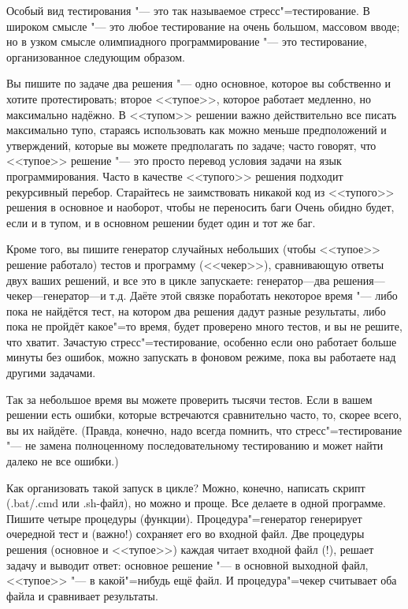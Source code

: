 Особый вид тестирования "--- это так называемое стресс"=тестирование. В широком смысле "--- это любое тестирование на очень большом, массовом вводе; 
но в узком смысле олимпиадного программирование "--- это тестирование, организованное следующим образом.

Вы пишите по задаче два решения "--- одно основное, которое вы собственно и хотите протестировать; второе <<тупое>>, которое работает медленно, но максимально надёжно. 
В <<тупом>> решении важно действительно все писать максимально тупо, стараясь использовать как можно меньше предположений и утверждений, 
которые вы можете предполагать по задаче; часто говорят, что <<тупое>> решение "--- это просто перевод условия задачи на язык программирования.
Часто в качестве <<тупого>> решения подходит рекурсивный перебор. 
Старайтесь не заимствовать никакой код из <<тупого>> решения в основное и наоборот, чтобы не переносить баги
Очень обидно будет, если и в тупом, и в основном решении будет один и тот же баг.

Кроме того, вы пишите генератор случайных небольших (чтобы <<тупое>> решение работало) тестов и программу (<<чекер>>), сравнивающую ответы двух ваших решений,
и все это в цикле запускаете: генера\-тор---два решения---чекер---генератор---и т.д. 
Даёте этой связке поработать некоторое время "--- либо пока не найдётся тест, на котором два решения дадут разные результаты,
либо пока не пройдёт какое"=то время, будет проверено много тестов, и вы не решите, что хватит.  
Зачастую стресс"=тестирование, особенно если оно работает больше минуты без ошибок, можно запускать в фоновом режиме, пока вы работаете над другими задачами.

Так за небольшое время вы можете проверить тысячи тестов. 
Если в вашем решении есть ошибки, которые встречаются сравнительно часто, то, скорее всего, вы их найдёте.
(Правда, конечно, надо всегда помнить, что стресс"=тестирование "--- не замена полноценному последовательному тестированию и может найти далеко не все ошибки.)

Как организовать такой запуск в цикле? 
Можно, конечно, написать скрипт (.bat/.cmd или .sh-файл), но можно и проще. 
Все делаете в одной программе. Пишите четыре процедуры (функции). 
Процедура"=генератор генерирует очередной тест и (важно!) сохраняет его во входной файл.
Две процедуры решения (основное и <<тупое>>) каждая читает входной файл (!), решает задачу и выводит ответ: основное решение "--- в основной выходной файл,
<<тупое>> "--- в какой"=нибудь ещё файл.
И процедура"=чекер считывает оба файла и сравнивает результаты.

